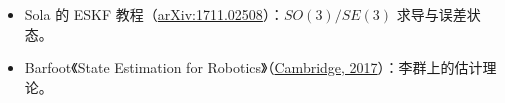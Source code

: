 \begin{reading}

\begin{itemize}
  \item Sola 的 ESKF 教程（\href{https://arxiv.org/abs/1711.02508}{arXiv:1711.02508}）：$SO(3)/SE(3)$ 求导与误差状态。
  \item Barfoot《State Estimation for Robotics》（\href{https://books.google.com/books?id=jfZFDwAAQBAJ}{Cambridge, 2017}）：李群上的估计理论。
\end{itemize}


\end{reading}
